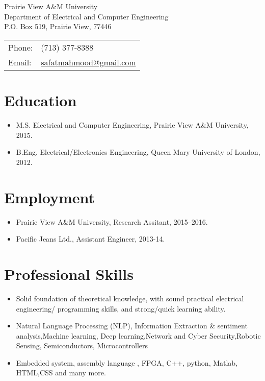 \section*{\large \bf \name}
\begin{singlespace}

\begin{minipage}{0.45\linewidth}
  Prairie View A\&M University \\
  Department of Electrical and Computer Engineering \\
  P.O. Box 519, Prairie View, 77446
\end{minipage}
\begin{minipage}{0.45\linewidth}
  \begin{tabular}{ll}
    Phone: & (713) 377-8388 \\
    Email: & \url{safatmahmood@gmail.com} \\
  \end{tabular}
\end{minipage}


\section*{\large \bf Education}

\begin{itemize}
  \item M.S. Electrical and Computer Engineering, Prairie View A\&M University, 2015.

  \item B.Eng. Electrical/Electronics Engineering, Queen Mary University of London, 2012.

\end{itemize}

\section*{\large \bf Employment}

\begin{itemize}
\item Prairie View A\&M University, Research Assitant, 2015--2016.
\item Pacific Jeans Ltd., Assistant Engineer, 2013-14.
\end{itemize}

\section*{\large \bf Professional Skills}
\begin{itemize}
\item Solid foundation of theoretical knowledge, with sound practical electrical engineering/ programming skills, and strong/quick learning ability.
\item Natural Language Processing (NLP), Information Extraction \& sentiment analysis,Machine learning, Deep learning,Network and Cyber Security,Robotic Sensing, Semiconductors, Microcontrollers
\item Embedded system, assembly language , FPGA, C++, python, Matlab, HTML,CSS and many more.
\end{itemize}


\end{singlespace}
